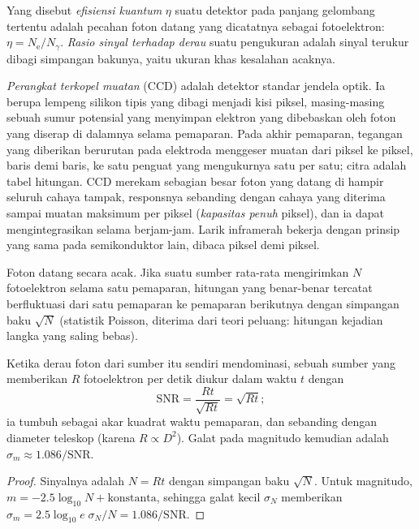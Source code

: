 \begin{definition}\label{def:b1:observing-the-sky:detector}
Yang disebut \emph{efisiensi kuantum} $\eta$ suatu detektor pada panjang gelombang tertentu adalah pecahan foton datang yang dicatatnya sebagai fotoelektron: $\eta = N_\mathrm{e}/N_\gamma$. \emph{Rasio sinyal terhadap derau} suatu pengukuran adalah sinyal terukur dibagi simpangan bakunya, yaitu ukuran khas kesalahan acaknya.
\end{definition}

\emph{Perangkat terkopel muatan} (CCD) adalah detektor standar jendela optik. Ia berupa lempeng silikon tipis yang dibagi menjadi kisi piksel, masing-masing sebuah sumur potensial yang menyimpan elektron yang dibebaskan oleh foton yang diserap di dalamnya selama pemaparan. Pada akhir pemaparan, tegangan yang diberikan berurutan pada elektroda menggeser muatan dari piksel ke piksel, baris demi baris, ke satu penguat yang mengukurnya satu per satu; citra adalah tabel hitungan. CCD merekam sebagian besar foton yang datang di hampir seluruh cahaya tampak, responsnya sebanding dengan cahaya yang diterima sampai muatan maksimum per piksel (\emph{kapasitas penuh} piksel), dan ia dapat mengintegrasikan selama berjam-jam. Larik inframerah bekerja dengan prinsip yang sama pada semikonduktor lain, dibaca piksel demi piksel.

Foton datang secara acak. Jika suatu sumber rata-rata mengirimkan $N$ fotoelektron selama satu pemaparan, hitungan yang benar-benar tercatat berfluktuasi dari satu pemaparan ke pemaparan berikutnya dengan simpangan baku $\sqrt N$ (statistik Poisson, diterima dari teori peluang: hitungan kejadian langka yang saling bebas).

\begin{proposition}\label{prop:b1:observing-the-sky:snr}
Ketika derau foton dari sumber itu sendiri mendominasi, sebuah sumber yang memberikan $R$ fotoelektron per detik diukur dalam waktu $t$ dengan 
\[
  \mathrm{SNR} = \frac{Rt}{\sqrt{Rt}} = \sqrt{Rt} ;
\]
ia tumbuh sebagai akar kuadrat waktu pemaparan, dan sebanding dengan diameter teleskop (karena $R \propto D^2$). Galat pada magnitudo kemudian adalah
$\sigma_m \approx 1.086/\mathrm{SNR}$.
\end{proposition}

\begin{proof}
Sinyalnya adalah $N = Rt$ dengan simpangan baku $\sqrt N$. Untuk magnitudo, $m = -2.5\log_{10}N + \text{konstanta}$, sehingga galat kecil $\sigma_N$ memberikan $\sigma_m = 2.5\log_{10}e\;\sigma_N/N = 1.086/\mathrm{SNR}$.
\end{proof}

